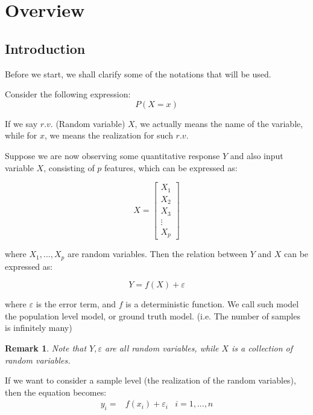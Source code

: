 \documentclass{article}
\theoremstyle{MyNonumberplain}
\theoremstyle{break}
\newtheorem{remark}{Remark}[section]
\theoremstyle{break}
\theoremstyle{break}
\theoremstyle{break}
\begin{document}
\newpage

\tableofcontents

\newpage


\section{Overview}

\subsection{Introduction}

Before we start, we shall clarify some of the notations that will be used.

Consider the following expression: $$P(X=x)$$

If we say $r.v.$ (Random variable) $X$, we actually means the name of the variable, while for $x$, we means the realization for such $r.v.$ 

Suppose we are now observing some quantitative response $Y$ and also input variable $X$, consisting of $p$ features, which can be expressed as:

$$
X=
    \begin{bmatrix}
        X_1 \\
        X_2 \\
        X_3 \\
        \vdots \\
        X_p
    \end{bmatrix}
$$

where $X_1,...,X_p$ are random variables. Then the relation between $Y$ and $X$ can be expressed as: 

$$
    Y=f(X)+\varepsilon
$$

where $\varepsilon$ is the error term, and $f$ is a deterministic function. We call such model the population level model, or ground truth model. (i.e. The number of samples is infinitely many)

\begin{warnbox}
    \begin{remark}
        Note that $Y,\varepsilon$ are all random variables, while $X$ is a collection of random variables.
    \end{remark}
\end{warnbox}

If we want to consider a sample level (the realization of the random variables), then the equation becomes:
    \begin{eqnarray*}
             y_i= & f(x_i)+\varepsilon_i & i=1,...,n
    \end{eqnarray*}
\end{document}
